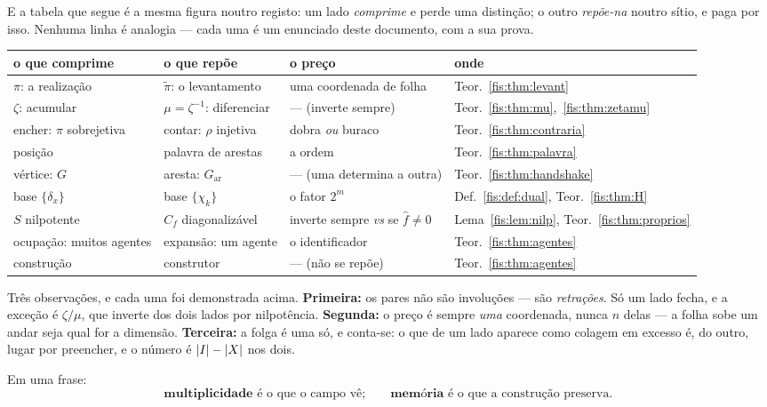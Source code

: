 \documentclass[livro.tex]{subfiles}
\begin{document}
\medskip\noindent E a tabela que segue é a mesma figura noutro registo: um lado
\emph{comprime} e perde uma distinção; o outro \emph{repõe-na} noutro sítio, e
paga por isso. Nenhuma linha é analogia --- cada uma é um enunciado deste
documento, com a sua prova.

\begin{center}\footnotesize
\begin{tabular}{@{}llll@{}}
\toprule
o que comprime & o que repõe & o preço & onde \\
\midrule
$\pi$: a realização & $\tilde\pi$: o levantamento & uma coordenada de folha & Teor.~\ref{fis:thm:levant} \\
$\zeta$: acumular & $\mu=\zeta^{-1}$: diferenciar & --- (inverte sempre) & Teor.~\ref{fis:thm:mu},~\ref{fis:thm:zetamu} \\
encher: $\pi$ sobrejetiva & contar: $\rho$ injetiva & dobra \emph{ou} buraco & Teor.~\ref{fis:thm:contraria} \\
posição & palavra de arestas & a ordem & Teor.~\ref{fis:thm:palavra} \\
vértice: $G$ & aresta: $G_{\mathrm{ar}}$ & --- (uma determina a outra) & Teor.~\ref{fis:thm:handshake} \\
base $\{\delta_x\}$ & base $\{\chi_k\}$ & o fator $2^{m}$ & Def.~\ref{fis:def:dual}, Teor.~\ref{fis:thm:H} \\
$S$ nilpotente & $C_f$ diagonalizável & inverte sempre \emph{vs} se $\widehat f\neq0$ & Lema~\ref{fis:lem:nilp}, Teor.~\ref{fis:thm:proprios} \\
ocupação: muitos agentes & expansão: um agente & o identificador & Teor.~\ref{fis:thm:agentes} \\
construção & construtor & --- (não se repõe) & Teor.~\ref{fis:thm:agentes} \\
\bottomrule
\end{tabular}
\end{center}

\medskip\noindent Três observações, e cada uma foi demonstrada acima.
\textbf{Primeira:} os pares não são involuções --- são \emph{retrações}. Só um
lado fecha, e a exceção é $\zeta/\mu$, que inverte dos dois lados por
nilpotência. \textbf{Segunda:} o preço é sempre \emph{uma} coordenada, nunca $n$
delas --- a folha sobe um andar seja qual for a dimensão. \textbf{Terceira:} a
folga é uma só, e conta-se: o que de um lado aparece como colagem em excesso é, do
outro, lugar por preencher, e o número é $\lvert I\rvert-\lvert X\rvert$ nos dois.

\medskip\noindent Em uma frase:
\[
\boxed{\ \textbf{multiplicidade} \text{ é o que o campo vê};\qquad
\textbf{memória} \text{ é o que a construção preserva.}\ }
\]
\end{document}
